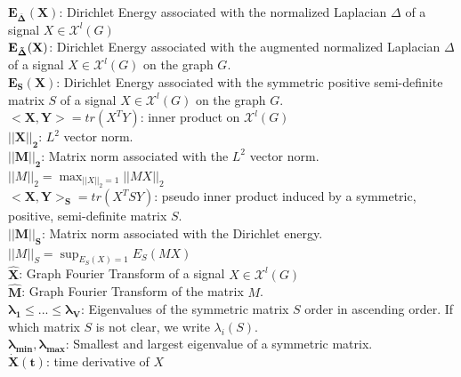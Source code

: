 \documentclass[12pt]{article}
\begin{document}
$\mathbf{E_{\bar{\Delta}}(X)}$: Dirichlet Energy associated with the normalized Laplacian $\Delta$ of a signal $X \in \mathcal{X}^l(G)$\\

$\mathbf{E_{\Tilde{\Delta}}(X)}$: Dirichlet Energy associated with the augmented normalized Laplacian $\Delta$ of a signal $X \in \mathcal{X}^l(G)$ on the graph $G$.\\

$\mathbf{E_{S}(X)}$: Dirichlet Energy associated with the symmetric positive semi-definite matrix $S$ of a signal $X \in \mathcal{X}^l(G)$ on the graph $G$.\\

$\mathbf{<X,Y>} = tr(X^T Y)$: inner product on $\mathcal{X}^l(G)$\\

$\mathbf{\left| \left| X \right| \right|_2}$: $L^2$ vector norm.\\

$\mathbf{\left| \left| M \right| \right|_2}$: Matrix norm associated with the $L^2$ vector norm. $\left| \left| M \right| \right|_2 = \max_{\left| \left| X \right| \right|_2 = 1} \left| \left| MX \right| \right|_2$ \\

$\mathbf{<X,Y>_{S}} = tr(X^T S Y)$: pseudo inner product induced by a symmetric, positive, semi-definite matrix $S$.\\


$\mathbf{\left| \left| M \right| \right|_S}$: Matrix norm associated with the Dirichlet energy. $\left| \left| M \right| \right|_S = \sup_{E_S(X) = 1} E_S(MX)$ \\

$\mathbf{\widehat{X}}$: Graph Fourier Transform of a signal $X \in \mathcal{X}^l(G)$\\

$\mathbf{\widehat{M}}$: Graph Fourier Transform of the matrix $M$.\\

$\mathbf{\lambda_1 \leq ... \leq \lambda_V}$: Eigenvalues of the symmetric matrix $S$ order in ascending order. If which matrix $S$ is not clear, we write $\lambda_i(S)$.\\

$\mathbf{\lambda_{min}, \lambda_{max}}$: Smallest and largest eigenvalue of a symmetric matrix.\\

$\mathbf{\dot{X}(t)}$: time derivative of $X$

\newpage
\tableofcontents
\end{document}

